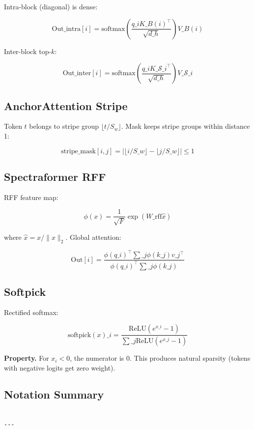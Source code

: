 Intra-block (diagonal) is dense:

\[
\text{Out}\_\text{intra}[i] = \text{softmax}\!\left(\frac{q\_i K\_{B(i)}^\top}{\sqrt{d\_h}}\right) V\_{B(i)}
\tag{3.7}
\]

Inter-block top-$k$:

\[
\text{Out}\_\text{inter}[i] = \text{softmax}\!\left(\frac{q\_i K\_{\mathcal{S}\_i}^\top}{\sqrt{d\_h}}\right) V\_{\mathcal{S}\_i}
\tag{3.8}
\]

\subsection{AnchorAttention Stripe}

Token $t$ belongs to stripe group $\lfloor t / S_w \rfloor$. Mask keeps 
stripe groups within distance 1:

\[
\text{stripe\_mask}[i, j] = \left|\lfloor i / S\_w \rfloor - \lfloor j / S\_w \rfloor\right| \leq 1
\tag{3.9}
\]

\subsection{Spectraformer RFF}

RFF feature map:

\[
\phi(x) = \frac{1}{\sqrt{F}} \exp(W\_\text{rff} \hat{x})
\tag{3.10}
\]

where $\hat{x} = x / \|x\|_2$. Global attention:

\[
\text{Out}[i] = \frac{\phi(q\_i)^\top \sum\_j \phi(k\_j) v\_j^\top}{\phi(q\_i)^\top \sum\_j \phi(k\_j)}
\tag{3.11}
\]

\subsection{Softpick}

Rectified softmax:

\[
\text{softpick}(x)\_i = \frac{\text{ReLU}(e^{x\_i} - 1)}{\sum\_j \text{ReLU}(e^{x\_j} - 1)}
\tag{3.12}
\]

\textbf{Property.} For $x_i < 0$, the numerator is 0. This produces natural 
sparsity (tokens with negative logits get zero weight).

\subsection{Notation Summary}

\begin{lstlisting}

---
\end{lstlisting}